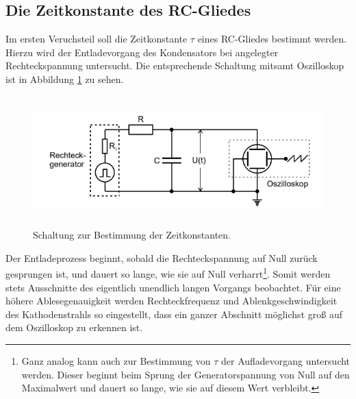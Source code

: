 \subsection{Die Zeitkonstante des RC-Gliedes}
Im ersten Veruchsteil soll die Zeitkonstante $\tau$ eines RC-Gliedes bestimmt werden.
Hierzu wird der Entladevorgang des Kondensators bei angelegter Rechteckspannung untersucht.
Die entsprechende Schaltung mitsamt Oszilloskop ist in Abbildung \ref{fig:zeitkonst} zu sehen.
\begin{figure}[H]
    \centering
    \includegraphics[height=5cm]{abbildungen/zeitkonstante.png}
    \caption[short]{Schaltung zur Bestimmung der Zeitkonstanten.}
    \label{fig:zeitkonst}
\end{figure}
Der Entladeprozess beginnt, sobald die Rechteckspannung auf Null zurück gesprungen ist, und dauert so lange, wie sie auf Null verharrt\footnote{Ganz 
analog kann auch zur Bestimmung von $\tau$ der Aufladevorgang untersucht werden.
Dieser beginnt beim Sprung der Generatorspannung von Null auf den Maximalwert und dauert so lange, 
wie sie auf diesem Wert verbleibt.}.
Somit werden stets Ausschnitte des eigentlich unendlich langen Vorgangs beobachtet.
Für eine höhere Ablesegenauigkeit werden Rechteckfrequenz und Ablenkgeschwindigkeit des Kathodenstrahls so eingestellt, 
dass ein ganzer Abschnitt möglichst groß auf dem Oszilloskop zu erkennen ist.
